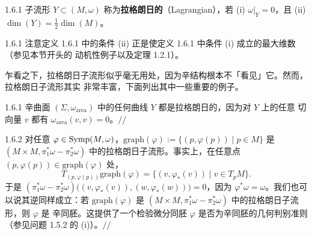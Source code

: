 \begin{wdefn}{1.6.1}
子流形 $Y\subset(M,\omega)$ 称为\textbf{拉格朗日的}（Lagrangian），若
(i) $\omega|_Y=0$，且 (ii) $\dim(Y)=\frac12\dim(M)$。
\end{wdefn}

\begin{wrem}{1.6.1}
注意定义 1.6.1 中的条件 (ii) 正是使定义 1.6.1 中条件 (i) 成立的最大维数（参见本节开头的
动机性例子以及定理 1.2.1）。
\end{wrem}

乍看之下，拉格朗日子流形似乎毫无用处，因为辛结构根本不「看见」它。然而，拉格朗日子流形其实
非常丰富，下面列出其中一些重要的例子。

\begin{wexam}{1.6.1}
辛曲面 $(\Sigma,\omega_{\mathrm{area}})$ 中的任何曲线 $Y$ 都是拉格朗日的，因为对 $Y$ 上的任意
切向量 $v$ 都有 $\omega_{\mathrm{area}}(v,v)=0$。\hfill$//$
\end{wexam}

\begin{wexam}{1.6.2}
对任意 $\varphi\in\operatorname{Symp}(M,\omega)$，$\mathrm{graph}(\varphi):=\{(p,\varphi(p))\mid p\in M\}$
是 $(M\times M,\pi_1^*\omega-\pi_2^*\omega)$ 中的拉格朗日子流形。事实上，在任意点
$(p,\varphi(p))\in\mathrm{graph}(\varphi)$ 处，
\[
  T_{(p,\varphi(p))}\mathrm{graph}(\varphi)
  =\{(v,\varphi_*(v))\mid v\in T_pM\}.
\]
于是
$(\pi_1^*\omega-\pi_2^*\omega)\big((v,\varphi_*(v)),(w,\varphi_*(w))\big)=0$，因为
$\varphi^*\omega=\omega$。我们也可以说其逆同样成立：若 $\mathrm{graph}(\varphi)$ 是
$(M\times M,\pi_1^*\omega-\pi_2^*\omega)$ 中的拉格朗日子流形，则 $\varphi$ 是
辛同胚。这提供了一个检验微分同胚 $\varphi$ 是否为辛同胚的几何判别准则
（参见问题 1.5.2 的 (i)）。\hfill$//$
\end{wexam}

